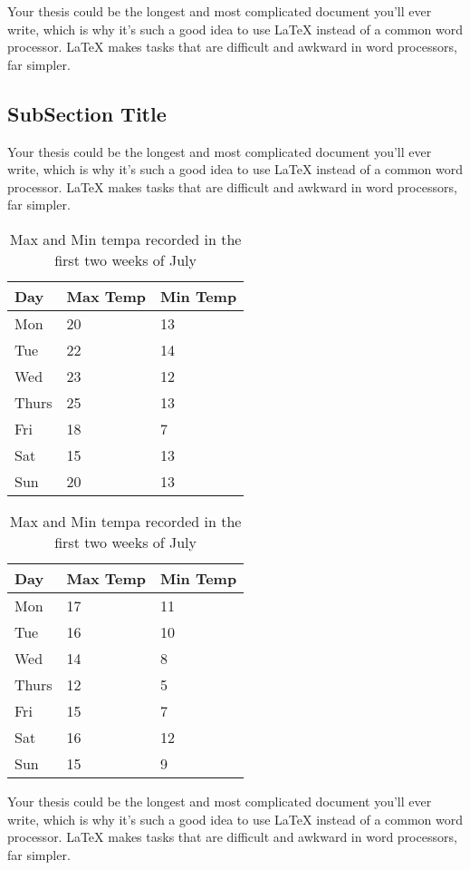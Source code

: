 Your thesis could be the longest and most complicated document you'll ever write, which is why it's such a good idea to use LaTeX instead of a common word processor. LaTeX makes tasks that are difficult and awkward in word processors, far simpler.

\subsection{SubSection Title}
Your thesis could be the longest and most complicated document you'll ever write, which is why it's such a good idea to use LaTeX instead of a common word processor. LaTeX makes tasks that are difficult and awkward in word processors, far simpler.

\begin{table}[h]
	\begin{subtable}[h]{0.45\textwidth}
		\centering
		\begin{tabular}{l | l | l}
			Day & Max Temp & Min Temp \\
			\hline \hline
			Mon & 20 & 13\\
			Tue & 22 & 14\\
			Wed & 23 & 12\\
			Thurs & 25 & 13\\
			Fri & 18 & 7\\
			Sat & 15 & 13\\
			Sun & 20 & 13
		\end{tabular}
		\caption{First Week}
		\label{tab:week1}
	\end{subtable}
	\hfill
	\begin{subtable}[h]{0.45\textwidth}
		\centering
		\begin{tabular}{l | l | l}
			Day & Max Temp & Min Temp\\
			\hline \hline
			Mon & 17 & 11\\
			Tue & 16 & 10\\
			Wed & 14 & 8\\
			Thurs & 12 & 5\\
			Fri & 15 & 7\\
			Sat & 16 & 12\\
			Sun & 15 & 9
		\end{tabular}
		\caption{Second Week}
		\label{tab:week2}
	\end{subtable}
	\caption{Max and Min tempa recorded in the first two weeks of July}
	\label{tab:temps}
\end{table}

Your thesis could be the longest and most complicated document you'll ever write, which is why it's such a good idea to use LaTeX instead of a common word processor. LaTeX makes tasks that are difficult and awkward in word processors, far simpler.